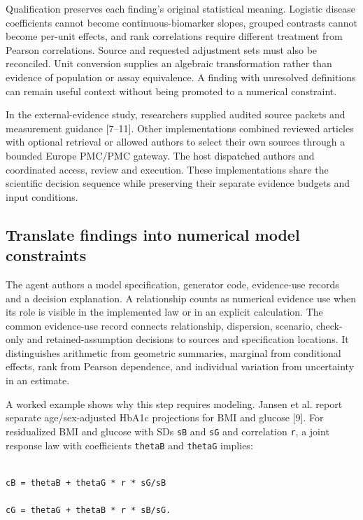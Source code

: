 \documentclass[sigconf,anonymous,review]{acmart}
\begin{document}
Qualification preserves each finding's original statistical meaning. Logistic disease coefficients cannot become continuous-biomarker slopes, grouped contrasts cannot become per-unit effects, and rank correlations require different treatment from Pearson correlations. Source and requested adjustment sets must also be reconciled. Unit conversion supplies an algebraic transformation rather than evidence of population or assay equivalence. A finding with unresolved definitions can remain useful context without being promoted to a numerical constraint.


In the external-evidence study, researchers supplied audited source packets and measurement guidance [7–\allowbreak{}11]. Other implementations combined reviewed articles with optional retrieval or allowed authors to select their own sources through a bounded Europe PMC/\allowbreak{}PMC gateway. The host dispatched authors and coordinated access, review and execution. These implementations share the scientific decision sequence while preserving their separate evidence budgets and input conditions.


\subsection{Translate findings into numerical model constraints}

The agent authors a model specification, generator code, evidence-use records and a decision explanation. A relationship counts as numerical evidence use when its role is visible in the implemented law or in an explicit calculation. The common evidence-use record connects relationship, dispersion, scenario, check-only and retained-assumption decisions to sources and specification locations. It distinguishes arithmetic from geometric summaries, marginal from conditional effects, rank from Pearson dependence, and individual variation from uncertainty in an estimate.


A worked example shows why this step requires modeling. Jansen et al. report separate age/\allowbreak{}sex-adjusted HbA1c projections for BMI and glucose [9]. For residualized BMI and glucose with SDs \texttt{sB} and \texttt{sG} and correlation \texttt{r}, a joint response law with coefficients \texttt{thetaB} and \texttt{thetaG} implies:


\noindent\begin{minipage}{\columnwidth}

\begin{lstlisting}

cB = thetaB + thetaG * r * sG/sB

cG = thetaG + thetaB * r * sB/sG.

\end{lstlisting}

\end{minipage}
\end{document}

